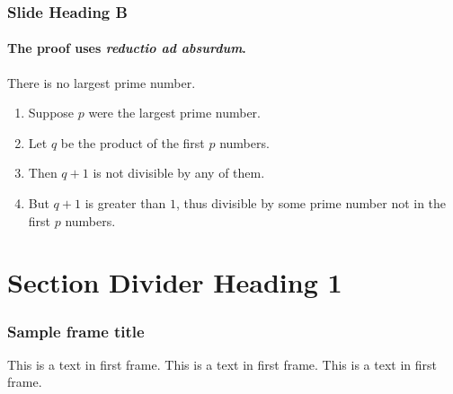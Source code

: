 \documentclass[handout]{beamer} 	%
\begin{document}
\begin{frame} 
\frametitle{Slide Heading B} 
\framesubtitle{The proof uses \textit{reductio ad absurdum}.} 

\begin{theorem}
There is no largest prime number. \end{theorem} 
\begin{enumerate} 
\item<1-| alert@1> Suppose $p$ were the largest prime number. 
\item<2-> Let $q$ be the product of the first $p$ numbers. 
\item<3-> Then $q+1$ is not divisible by any of them. 
\item<1-> But $q + 1$ is greater than $1$, thus divisible by some prime
number not in the first $p$ numbers.
\end{enumerate}

\end{frame}



\section{Section Divider Heading 1}
\begin{frame}
  \sectionpage
\end{frame}


\begin{frame}
\frametitle{Sample frame title}
This is a text in first frame. This is a text in first frame. This is a text in first frame.
\end{frame}

\end{document}
